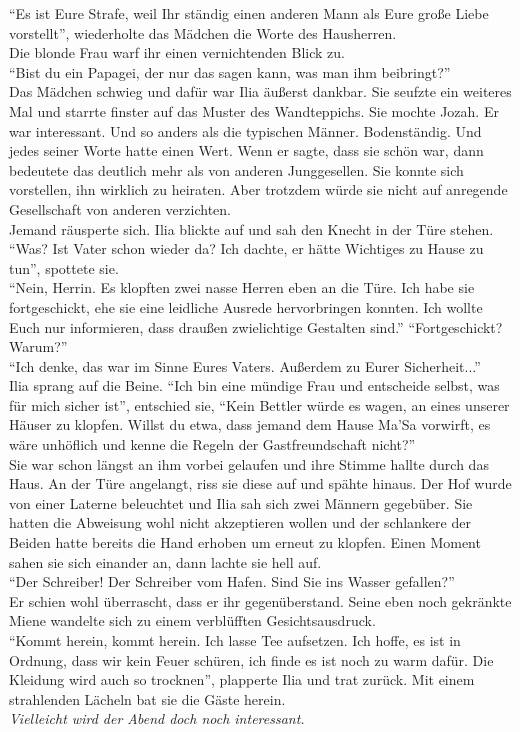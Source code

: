 ``Es ist Eure Strafe, weil Ihr ständig einen anderen Mann als Eure große Liebe 
vorstellt'', wiederholte das Mädchen die Worte des Hausherren. \\
Die blonde Frau warf ihr einen vernichtenden Blick zu. \\
``Bist du ein Papagei, der nur das sagen kann, was man ihm beibringt?'' \\
Das Mädchen schwieg und dafür war Ilia äußerst dankbar. Sie seufzte ein 
weiteres Mal und starrte finster auf das Muster des Wandteppichs. Sie mochte 
Jozah. Er war interessant. Und so anders als die typischen Männer. Bodenständig. 
Und jedes seiner Worte hatte einen Wert. Wenn er sagte, dass sie schön war, dann 
bedeutete das deutlich mehr als von anderen Junggesellen. Sie konnte sich 
vorstellen, ihn wirklich zu heiraten. Aber trotzdem würde sie nicht auf 
anregende Gesellschaft von anderen verzichten. \\
Jemand räusperte sich. Ilia blickte auf und sah den Knecht in der Türe stehen. 
``Was? Ist Vater schon wieder da? Ich dachte, er hätte Wichtiges zu Hause zu 
tun'', spottete sie. \\
``Nein, Herrin. Es klopften zwei nasse Herren eben an die Türe. Ich habe sie 
fortgeschickt, ehe sie eine leidliche Ausrede hervorbringen konnten. Ich wollte 
Euch nur informieren, dass draußen zwielichtige Gestalten sind.''
``Fortgeschickt? Warum?'' \\
``Ich denke, das war im Sinne Eures Vaters. Außerdem zu Eurer Sicherheit...'' \\
Ilia sprang auf die Beine. ``Ich bin eine mündige Frau und entscheide selbst, 
was für mich sicher ist'', entschied sie, ``Kein Bettler würde es wagen, an eines 
unserer Häuser zu klopfen. Willst du etwa, dass jemand dem Hause Ma'Sa 
vorwirft, es wäre unhöflich und kenne die Regeln der Gastfreundschaft nicht?'' \\
Sie war schon längst an ihm vorbei gelaufen und ihre Stimme hallte durch das 
Haus. An der Türe angelangt, riss sie diese auf und spähte hinaus. Der Hof 
wurde von einer Laterne beleuchtet und Ilia sah sich zwei Männern gegebüber. 
Sie hatten die Abweisung wohl nicht akzeptieren wollen und der schlankere der 
Beiden hatte bereits die Hand erhoben um erneut zu klopfen.
Einen Moment sahen sie sich einander an, dann lachte sie hell auf. \\
``Der Schreiber! Der Schreiber vom Hafen. Sind Sie ins Wasser gefallen?'' \\
Er schien wohl überrascht, dass er ihr gegenüberstand. Seine eben noch 
gekränkte Miene wandelte sich zu einem verblüfften Gesichtsausdruck. \\
``Kommt herein, kommt herein. Ich lasse Tee aufsetzen. Ich hoffe, es ist in 
Ordnung, dass wir kein Feuer schüren, ich finde es ist noch zu warm dafür. Die 
Kleidung wird auch so trocknen'', plapperte Ilia und trat zurück. Mit einem 
strahlenden Lächeln bat sie die Gäste herein. \\
\textit{Vielleicht wird der Abend doch noch interessant.}